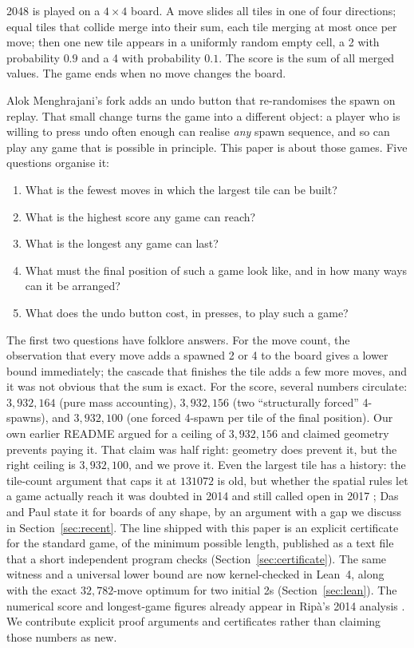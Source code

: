 \documentclass[11pt]{article}
\theoremstyle{definition}
\theoremstyle{remark}
\begin{document}
2048 \cite{cirulli2014} is played on a $4\times4$ board. A move slides all
tiles in one of four directions; equal tiles that collide merge into their
sum, each tile merging at most once per move; then one new tile appears in
a uniformly random empty cell, a 2 with probability $0.9$ and a 4 with
probability $0.1$. The score is the sum of all merged values. The game
ends when no move changes the board.

Alok Menghrajani's fork \cite{menghrajani2014} adds an undo button that
re-randomises the spawn on replay. That small change turns the game into a
different object: a player who is willing to press undo often enough can
realise \emph{any} spawn sequence, and so can play any game that is possible
in principle. This paper is about those games. Five questions organise it:
\begin{enumerate}[nosep]
\item What is the fewest moves in which the largest tile can be built?
\item What is the highest score any game can reach?
\item What is the longest any game can last?
\item What must the final position of such a game look like, and in how
many ways can it be arranged?
\item What does the undo button cost, in presses, to play such a game?
\end{enumerate}

The first two questions have folklore answers. For the move count, the
observation that every move adds a spawned 2 or 4 to the board gives a
lower bound immediately; the cascade that finishes the tile adds a few more
moves, and it was not obvious that the sum is exact. For the score, several
numbers circulate: $3{,}932{,}164$ (pure mass accounting), $3{,}932{,}156$
(two ``structurally forced'' 4-spawns), and $3{,}932{,}100$ (one forced
4-spawn per tile of the final position). Our own earlier README argued
for a ceiling of $3{,}932{,}156$ and claimed geometry prevents paying it.
That claim was half right: geometry does prevent it, but the right ceiling
is $3{,}932{,}100$, and we prove it. Even the largest tile has a history:
the tile-count argument that caps it at $131072$ is old, but whether the
spatial rules let a game actually reach it was doubted in 2014
\cite{rodgers2014} and still called open in 2017 \cite{leesmiller2017c};
Das and Paul \cite{daspaul2018} state it for boards of any shape, by an
argument with a gap we discuss in Section~\ref{sec:recent}. The line
shipped with this paper is an explicit certificate for the standard game,
of the minimum possible length, published as a text file that a short
independent program checks (Section~\ref{sec:certificate}). The same
witness and a universal lower bound are now kernel-checked in Lean~4,
along with the exact $32{,}782$-move optimum for two initial 2s
(Section~\ref{sec:lean}). The numerical score and longest-game figures already appear in
Rip\`a's 2014 analysis \cite{ripa2014,ripaoeis2014}. We contribute
explicit proof arguments and certificates rather than claiming those
numbers as new.
\end{document}
